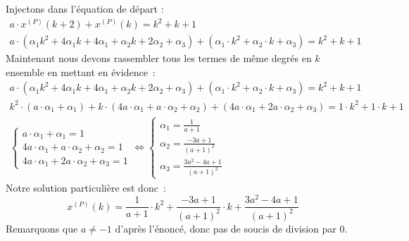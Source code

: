 \documentclass[11pt,a4paper]{report}
\begin{document}
			Injectons dans l'équation de départ :
			\begin{gather*}
				a \cdot x^{(P)}(k+2) + x^{(P)}(k) = k^2 + k + 1\\
				a \cdot (\alpha_1 k^2 + 4\alpha_1k + 4\alpha_1 + \alpha_2 k + 2\alpha_2 + \alpha_3) + (\alpha_1 \cdot k^2 + \alpha_2 \cdot k + \alpha_3) = k^2 + k + 1
			\end{gather*}
			Maintenant nous devons rassembler tous les termes de même degrés en $k$ ensemble en mettant en évidence~:
			\begin{gather*}
				a \cdot (\alpha_1 k^2 + 4\alpha_1k + 4\alpha_1 + \alpha_2 k + 2\alpha_2 + \alpha_3) + (\alpha_1 \cdot k^2 + \alpha_2 \cdot k + \alpha_3) = k^2 + k + 1\\
				k^2 \cdot (a \cdot \alpha_1 + \alpha_1) + k \cdot (4 a \cdot \alpha_1 + a \cdot \alpha_2 + \alpha_2) + (4a \cdot \alpha_1  + 2 a\cdot \alpha_2 + \alpha_3) = 1 \cdot k^2 + 1 \cdot k + 1 \\
				\begin{cases}
					a \cdot \alpha_1 + \alpha_1 = 1\\
					4 a \cdot \alpha_1 + a \cdot \alpha_2 + \alpha_2 = 1 \\
					4a \cdot \alpha_1  + 2 a\cdot \alpha_2 + \alpha_3 = 1
				\end{cases} \Leftrightarrow
				\begin{cases}
					\alpha_1 = \frac{1}{a+1}\\
					\alpha_2 = \frac{-3a + 1}{(a+1)^2} \\
					\alpha_3 = \frac{3a^2-4a+1}{(a+1)^2}
				\end{cases}
			\end{gather*}
			Notre solution particulière est donc~:
			\[
				x^{(P)}(k) = \frac{1}{a+1} \cdot k^2 + \frac{-3a + 1}{(a+1)^2} \cdot k + \frac{3a^2-4a+1}{(a+1)^2}
			\]
			Remarquons que $a \neq -1$ d'après l'énoncé, donc pas de soucis de division par 0.
\end{document}
